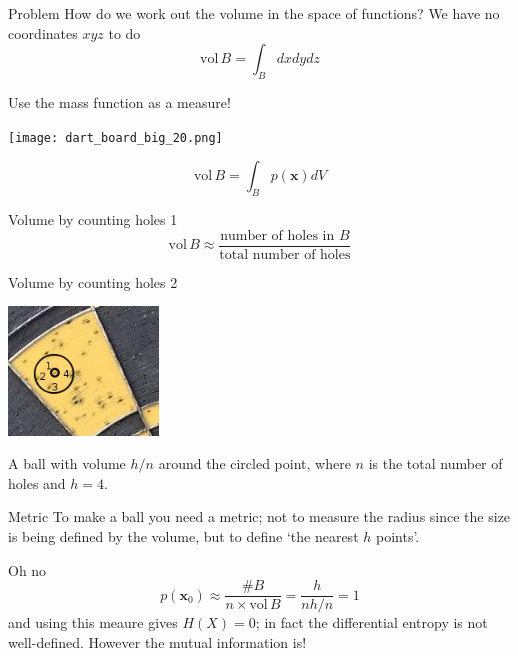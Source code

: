 \documentclass{beamer}
\begin{document}
\begin{frame}{Problem}
\color{black}
How do we work out the volume in the space of functions? We have no coordinates $xyz$ to do
\color{dark}
$$\mbox{vol}\,B=\int_B dxdydz$$
\end{frame}

\begin{frame}{Use the mass function as a measure!}
\color{reddish}
\begin{center}
\texttt{[image: dart\_board\_big\_20.png]}
\end{center}
\color{dark}
$$\mbox{vol}\,B=\int_B p(\mathbf{x}) dV$$
\color{black}
\end{frame}


\begin{frame}{Volume by counting holes 1}
\color{dark}
$$\mbox{vol}\,B\approx \frac{\mbox{number of holes in }B}{\mbox{total number of holes}}$$
\end{frame}

\begin{frame}{Volume by counting holes 2}
\color{reddish}
\begin{center}
\includegraphics[width=4cm]{dart_board_zoom_ball.png}
\end{center}
\color{black}
A ball with volume $h/n$ around the circled point, where $n$ is the total number of holes and $h=4$.
\end{frame}


\begin{frame}{Metric}
To make a ball you need a metric; not to measure the radius since the
size is being defined by the volume, but to define \lq{}the nearest
$h$ points\rq{}.
\color{reddish}
\begin{center}
\color{reddish}

\end{center}
\end{frame}


\begin{frame}{Oh no}
$$p(\mathbf{x}_0)\approx\frac{\#B}{n\times \mbox{vol}\,B}=\frac{h}{nh/n}=1$$
and using this meaure gives $H(X)=0$; in fact the
  differential entropy is not well-defined. However the
  mutual information is!
\end{frame}
\end{document}
